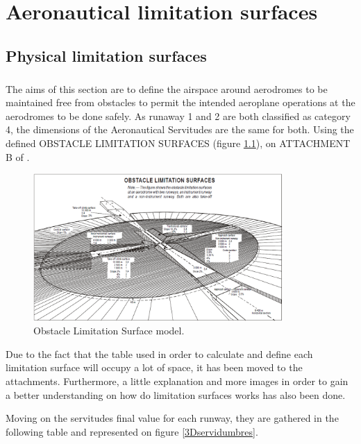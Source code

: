 \chapter{Aeronautical limitation surfaces}

	\section{Physical limitation surfaces}
	\paragraph{}The aims of this section are to define the airspace around aerodromes to be	maintained free from obstacles to permit the intended aeroplane operations at the aerodromes to be done safely.
	As runaway 1 and 2 are both classified as category 4, the dimensions of the Aeronautical Servitudes are the same for both. Using the defined OBSTACLE LIMITATION SURFACES (figure \ref{servitudeMap}), on ATTACHMENT B of \cite{Standards2016}.
	
	\begin{figure}[H]
		\centering
		\includegraphics[clip, trim=0cm 0cm 0cm 0cm, width=0.85\textwidth]{./images/servidumbres/servitudeMap}
		\caption{Obstacle Limitation Surface model.}
		\label{servitudeMap}
	\end{figure}

	Due to the fact that the table used in order to calculate and define each limitation surface will occupy a lot of space, it has been moved to the attachments. Furthermore, a little explanation and more images in order to gain a better understanding on how do limitation surfaces works has also been done. 
	
	Moving on the servitudes final value for each runway, they are gathered in the following table and represented on figure \ref{3Dservidumbres}.
	
